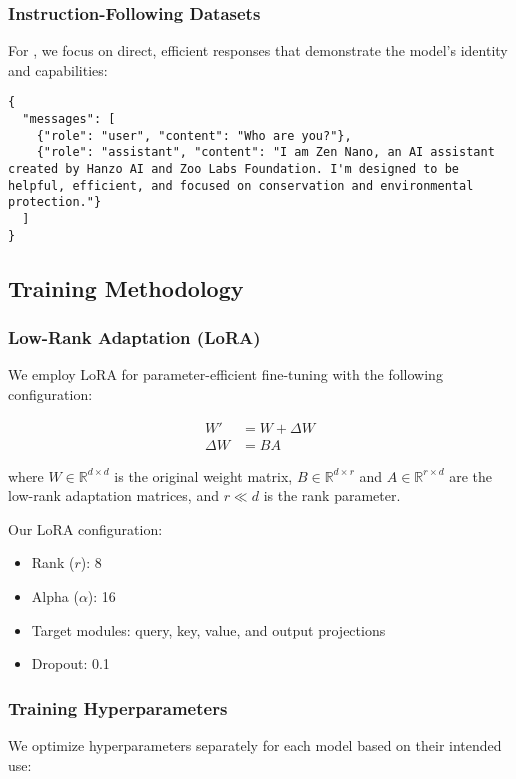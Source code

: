 \subsubsection{Instruction-Following Datasets}
For \zennano{}, we focus on direct, efficient responses that demonstrate the model's identity and capabilities:

\begin{lstlisting}[caption=Example instruction-mode training sample,label=lst:instruct-example]
{
  "messages": [
    {"role": "user", "content": "Who are you?"},
    {"role": "assistant", "content": "I am Zen Nano, an AI assistant created by Hanzo AI and Zoo Labs Foundation. I'm designed to be helpful, efficient, and focused on conservation and environmental protection."}
  ]
}
\end{lstlisting}

\subsection{Training Methodology}

\subsubsection{Low-Rank Adaptation (LoRA)}
We employ LoRA for parameter-efficient fine-tuning with the following configuration:

\begin{align}
W' &= W + \Delta W \\
\Delta W &= BA
\end{align}

where $W \in \mathbb{R}^{d \times d}$ is the original weight matrix, $B \in \mathbb{R}^{d \times r}$ and $A \in \mathbb{R}^{r \times d}$ are the low-rank adaptation matrices, and $r \ll d$ is the rank parameter.

Our LoRA configuration:
\begin{itemize}
    \item Rank ($r$): 8
    \item Alpha ($\alpha$): 16
    \item Target modules: query, key, value, and output projections
    \item Dropout: 0.1
\end{itemize}

\subsubsection{Training Hyperparameters}
We optimize hyperparameters separately for each model based on their intended use:

